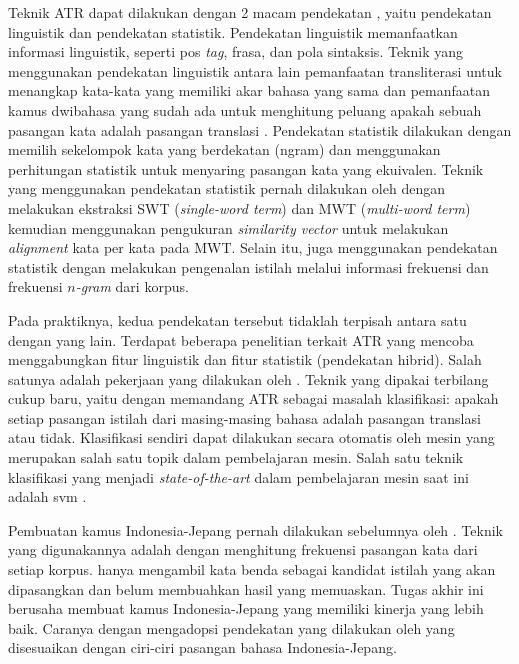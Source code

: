 \documentclass[../main/main.tex]{subfiles}
\begin{document}
Teknik ATR dapat dilakukan dengan 2 macam pendekatan \parencite{lefever}, yaitu pendekatan linguistik dan pendekatan statistik. Pendekatan linguistik memanfaatkan informasi linguistik, seperti \gls{pos} \textit{tag}, frasa, dan pola sintaksis. Teknik yang menggunakan pendekatan linguistik antara lain pemanfaatan transliterasi untuk menangkap kata-kata yang memiliki akar bahasa yang sama \parencite{tsuji} dan pemanfaatan kamus dwibahasa yang sudah ada untuk menghitung peluang apakah sebuah pasangan kata adalah pasangan translasi \parencite{jagarlamudi}. Pendekatan statistik dilakukan dengan memilih sekelompok kata yang berdekatan (\gls{ngram}) dan menggunakan perhitungan statistik untuk menyaring pasangan kata yang ekuivalen. Teknik yang menggunakan pendekatan statistik pernah dilakukan oleh \textcite{daille} dengan melakukan ekstraksi SWT (\textit{single-word term}) dan MWT (\textit{multi-word term}) kemudian menggunakan pengukuran \textit{similarity vector} untuk melakukan \textit{alignment} kata per kata pada MWT. Selain itu, \textcite{lefever} juga menggunakan pendekatan statistik dengan melakukan pengenalan istilah melalui informasi frekuensi dan frekuensi \textit{$n$-gram} dari korpus.

Pada praktiknya, kedua pendekatan tersebut tidaklah terpisah antara satu dengan yang lain. Terdapat beberapa penelitian terkait ATR yang mencoba menggabungkan fitur linguistik dan fitur statistik (pendekatan hibrid). Salah satunya adalah pekerjaan yang dilakukan oleh \textcite{aker}. Teknik yang dipakai terbilang cukup baru, yaitu dengan memandang ATR sebagai masalah klasifikasi: apakah setiap pasangan istilah dari masing-masing bahasa adalah pasangan translasi atau tidak. Klasifikasi sendiri dapat dilakukan secara otomatis oleh mesin yang merupakan salah satu topik dalam pembelajaran mesin. Salah satu teknik klasifikasi yang menjadi \textit{state-of-the-art} dalam pembelajaran mesin saat ini adalah \gls{svm} \parencite{christianini}.

Pembuatan kamus Indonesia-Jepang pernah dilakukan sebelumnya oleh \textcite{limanthie}. Teknik yang digunakannya adalah dengan menghitung frekuensi pasangan kata dari setiap korpus. \textcite{limanthie} hanya mengambil kata benda sebagai kandidat istilah yang akan dipasangkan dan belum membuahkan hasil yang memuaskan. Tugas akhir ini berusaha membuat kamus Indonesia-Jepang yang memiliki kinerja yang lebih baik. Caranya dengan mengadopsi pendekatan yang dilakukan oleh \textcite{aker} yang disesuaikan dengan ciri-ciri pasangan bahasa Indonesia-Jepang.
\end{document}
